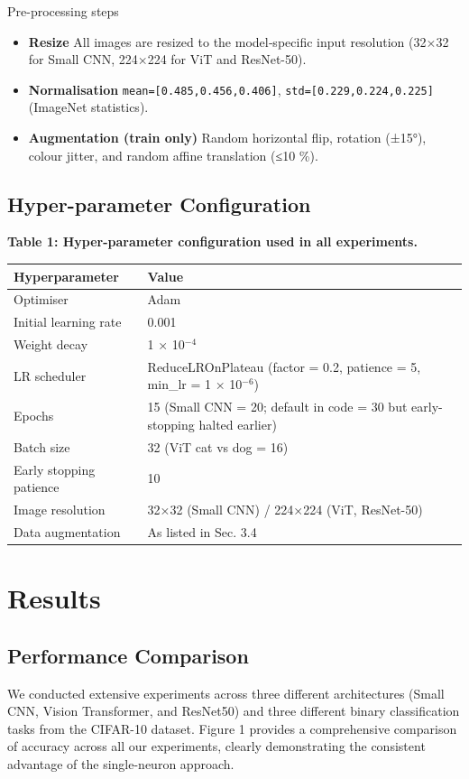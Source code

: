 \documentclass[11pt]{article}
\begin{document}
Pre-processing steps
\begin{itemize}
\item \textbf{Resize} All images are resized to the model‐specific input resolution (32×32 for Small CNN, 224×224 for ViT and ResNet-50).
\item \textbf{Normalisation} \texttt{mean=[0.485,0.456,0.406]}, \texttt{std=[0.229,0.224,0.225]} (ImageNet statistics).
\item \textbf{Augmentation (train only)} Random horizontal flip, rotation (±15°), colour jitter, and random affine translation (≤10 \%).
\end{itemize}

\subsection{Hyper-parameter Configuration}
\textbf{Table 1: Hyper-parameter configuration used in all experiments.}

\begin{tabular}{ll}
\hline
Hyperparameter & Value \\
\hline
Optimiser & Adam \\
Initial learning rate & 0.001 \\
Weight decay & 1 × 10$^{-4}$ \\
LR scheduler & ReduceLROnPlateau (factor = 0.2, patience = 5, min\_lr = 1 × 10$^{-6}$) \\
Epochs & 15 (Small CNN = 20; default in code = 30 but early-stopping halted earlier) \\
Batch size & 32 (ViT cat vs dog = 16) \\
Early stopping patience & 10 \\
Image resolution & 32×32 (Small CNN) / 224×224 (ViT, ResNet-50) \\
Data augmentation & As listed in Sec. 3.4 \\
\hline
\end{tabular}



\section{Results}
\subsection{Performance Comparison}
We conducted extensive experiments across three different architectures (Small CNN, Vision Transformer, and ResNet50) and three different binary classification tasks from the CIFAR-10 dataset. Figure 1 provides a comprehensive comparison of accuracy across all our experiments, clearly demonstrating the consistent advantage of the single-neuron approach.
\end{document}
